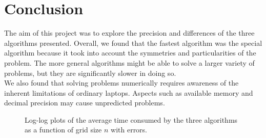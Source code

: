 \documentclass[notitlepage, reprint, nofootinbib]{revtex4-1}
\begin{document}
\section{Conclusion}
The aim of this project was to explore the precision and differences of the three algorithms presented. Overall, we found that the fastest algorithm was the special algorithm because it took into account the symmetries and particularities of the problem. The more general algorithms might be able to solve a larger variety of problems, but they are significantly slower in doing so. \\[2mm]
We also found that solving problems numerically requires awareness of the inherent limitations of ordinary laptops. Aspects such as available memory and decimal precision may cause unpredicted problems.
\onecolumngrid
\begin{center}\begin{figure}[t]
	\centering
	\caption{Log-log plots of the average time consumed by the three algorithms as a function of grid size $n$ with errors.}
	\label{fig3}
\end{figure}\end{center}
\twocolumngrid
\onecolumngrid


\end{document}
